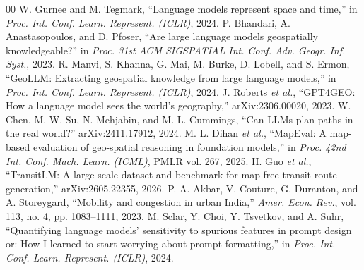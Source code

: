 \documentclass[conference]{IEEEtran}
\begin{document}
\begin{thebibliography}{00}
 W. Gurnee and M. Tegmark, ``Language models represent space and time,'' in \textit{Proc. Int. Conf. Learn. Represent. (ICLR)}, 2024.
 P. Bhandari, A. Anastasopoulos, and D. Pfoser, ``Are large language models geospatially knowledgeable?'' in \textit{Proc. 31st ACM SIGSPATIAL Int. Conf. Adv. Geogr. Inf. Syst.}, 2023.
 R. Manvi, S. Khanna, G. Mai, M. Burke, D. Lobell, and S. Ermon, ``GeoLLM: Extracting geospatial knowledge from large language models,'' in \textit{Proc. Int. Conf. Learn. Represent. (ICLR)}, 2024.
 J. Roberts \textit{et al.}, ``GPT4GEO: How a language model sees the world's geography,'' arXiv:2306.00020, 2023.
 W. Chen, M.-W. Su, N. Mehjabin, and M. L. Cummings, ``Can LLMs plan paths in the real world?'' arXiv:2411.17912, 2024.
 M. L. Dihan \textit{et al.}, ``MapEval: A map-based evaluation of geo-spatial reasoning in foundation models,'' in \textit{Proc. 42nd Int. Conf. Mach. Learn. (ICML)}, PMLR vol. 267, 2025.
 H. Guo \textit{et al.}, ``TransitLM: A large-scale dataset and benchmark for map-free transit route generation,'' arXiv:2605.22355, 2026.
 P. A. Akbar, V. Couture, G. Duranton, and A. Storeygard, ``Mobility and congestion in urban India,'' \textit{Amer. Econ. Rev.}, vol. 113, no. 4, pp. 1083--1111, 2023.
 M. Sclar, Y. Choi, Y. Tsvetkov, and A. Suhr, ``Quantifying language models' sensitivity to spurious features in prompt design or: How I learned to start worrying about prompt formatting,'' in \textit{Proc. Int. Conf. Learn. Represent. (ICLR)}, 2024.
\end{thebibliography}
\end{document}
